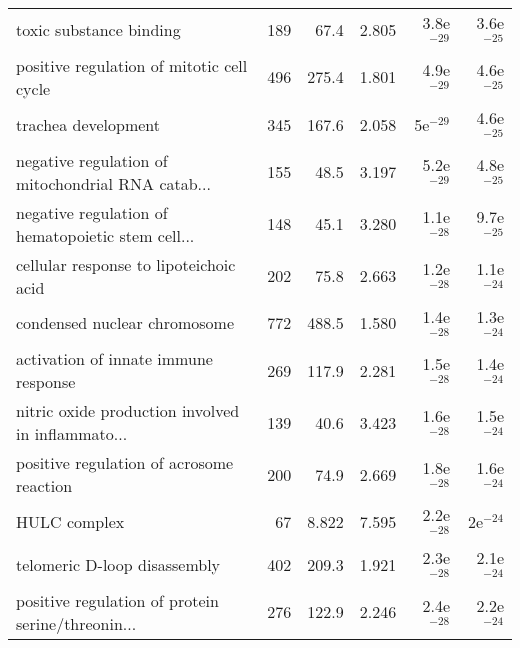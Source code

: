 \begin{longtable}{lrrrrr}
                           toxic substance binding &                     189 &                    67.4 &      2.805 &         3.8e$^{-29}$ &         3.6e$^{-25}$ \\
         positive regulation of mitotic cell cycle &                     496 &                   275.4 &      1.801 &         4.9e$^{-29}$ &         4.6e$^{-25}$ \\
                               trachea development &                     345 &                   167.6 &      2.058 &           5e$^{-29}$ &         4.6e$^{-25}$ \\
 negative regulation of mitochondrial RNA catab... &                     155 &                    48.5 &      3.197 &         5.2e$^{-29}$ &         4.8e$^{-25}$ \\
 negative regulation of hematopoietic stem cell... &                     148 &                    45.1 &      3.280 &         1.1e$^{-28}$ &         9.7e$^{-25}$ \\
            cellular response to lipoteichoic acid &                     202 &                    75.8 &      2.663 &         1.2e$^{-28}$ &         1.1e$^{-24}$ \\
                      condensed nuclear chromosome &                     772 &                   488.5 &      1.580 &         1.4e$^{-28}$ &         1.3e$^{-24}$ \\
              activation of innate immune response &                     269 &                   117.9 &      2.281 &         1.5e$^{-28}$ &         1.4e$^{-24}$ \\
 nitric oxide production involved in inflammato... &                     139 &                    40.6 &      3.423 &         1.6e$^{-28}$ &         1.5e$^{-24}$ \\
          positive regulation of acrosome reaction &                     200 &                    74.9 &      2.669 &         1.8e$^{-28}$ &         1.6e$^{-24}$ \\
                                      HULC complex &                      67 &                   8.822 &      7.595 &         2.2e$^{-28}$ &           2e$^{-24}$ \\
                      telomeric D-loop disassembly &                     402 &                   209.3 &      1.921 &         2.3e$^{-28}$ &         2.1e$^{-24}$ \\
 positive regulation of protein serine/threonin... &                     276 &                   122.9 &      2.246 &         2.4e$^{-28}$ &         2.2e$^{-24}$ \\

\end{longtable}
